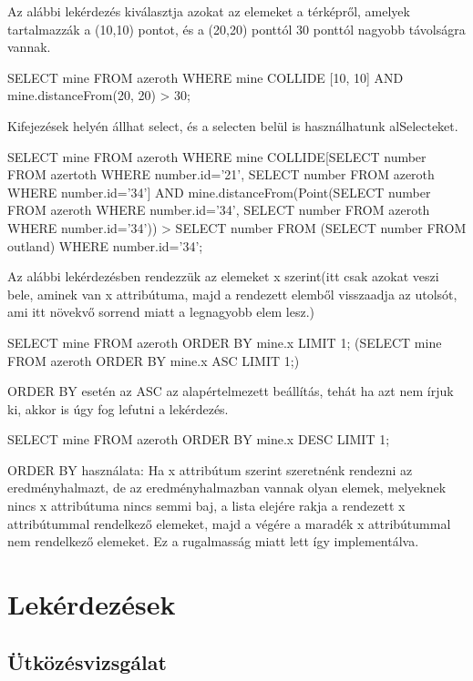 \begin{sql}
Az alábbi lekérdezés kiválasztja azokat az elemeket a térképről, amelyek tartalmazzák a (10,10) pontot, és a (20,20) ponttól 30 ponttól nagyobb távolságra vannak.
\begin{sql}
SELECT mine
FROM azeroth
WHERE mine COLLIDE [10, 10] AND mine.distanceFrom(20, 20) > 30;
\end{sql}

Kifejezések helyén állhat select, és a selecten belül is használhatunk alSelecteket.
\begin{sql}
SELECT mine
FROM azeroth
WHERE mine COLLIDE[SELECT number FROM azertoth WHERE number.id='21', SELECT number FROM azeroth WHERE number.id='34']
 AND mine.distanceFrom(Point(SELECT number FROM azeroth WHERE number.id='34', SELECT number FROM azeroth WHERE number.id='34')) > SELECT number FROM (SELECT number FROM outland) WHERE number.id='34';
\end{sql}


Az alábbi lekérdezésben rendezzük az elemeket x szerint(itt csak azokat veszi bele, aminek van x attribútuma, majd a rendezett elemből visszaadja az utolsót, ami itt növekvő sorrend miatt a legnagyobb elem lesz.)
\begin{sql}
SELECT mine FROM azeroth ORDER BY mine.x LIMIT 1;
(SELECT mine FROM azeroth ORDER BY mine.x ASC LIMIT 1;)
\end{sql}

ORDER BY esetén az ASC az alapértelmezett beállítás, tehát ha azt nem írjuk ki, akkor is úgy fog lefutni a lekérdezés.

\begin{sql}
SELECT mine FROM azeroth ORDER BY mine.x DESC LIMIT 1;
\end{sql}


ORDER BY használata: Ha x attribútum szerint szeretnénk rendezni az eredményhalmazt, de az eredményhalmazban vannak olyan elemek, melyeknek nincs x attribútuma nincs semmi baj, a lista elejére rakja a rendezett x attribútummal rendelkező elemeket, majd a végére a maradék x attribútummal nem rendelkező elemeket. Ez a rugalmasság miatt lett így implementálva.


\section{Lekérdezések}

\subsection{Ütközésvizsgálat}


\end{sql}
